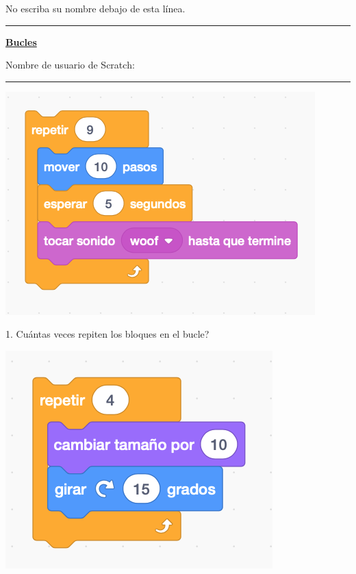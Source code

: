 \documentclass[letterpaper,12pt]{article}
\newcommand\numbox{%
    \fbox{\rule{1in}{0pt}\rule[-1ex]{0pt}{5ex}}}
\begin{document}
\noindent No escriba su nombre debajo de esta línea. \\
\noindent \hrule
\begin{center}
{\Large \textbf{\underline{Bucles}}} \\
\end{center}
Nombre de usuario de Scratch: \rule{4cm}{0.4pt}

\noindent \dotfill


\begin{center}
\includegraphics[scale=.6]{q1_script0.png}
\end{center}
1. Cuántas veces repiten los bloques en el bucle?
\numbox \\

\noindent \dotfill
\begin{center}
\includegraphics[scale=.7]{q2_script0.png}
\end{center}
\end{document}
